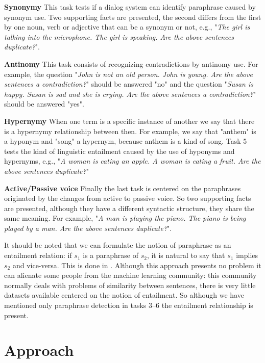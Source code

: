 \textbf{Synonymy} This task tests if a dialog system can identify paraphrase caused by synonym use. Two supporting facts are presented, the second differs from the first by one noun, verb or adjective that can be a synonym or not, e.g., "\textit{The girl is talking into the microphone. The girl is speaking. Are the above sentences duplicate?}".   


\textbf{Antinomy} This task consists of recognizing contradictions by antinomy use. For example, the question "\textit{John is not an old person. John is young. Are the above sentences a contradiction?}" should be answered "no" and the question "\textit{Susan is happy. Susan is sad and she is crying. Are the above sentences a contradiction?}" should be answered "yes".

\textbf{Hypernymy} When one term is a specific instance of another we say that there is a hypernymy relationship between then. For example, we say that "anthem" is a hyponym and "song" a hypernym, because anthem is a kind of song. Task 5 tests the kind of linguistic entailment caused by the use of hyponyms and hypernyms, e.g., "\textit{A woman is eating an apple. A woman is eating a fruit. Are the above sentences duplicate?}"


\textbf{Active/Passive voice} Finally the last task is centered on the paraphrases originated by the changes from active to passive voice. So two supporting facts are presented, although they have a different syntactic structure, they share the same meaning. For example,  "\textit{A man is playing the piano. The piano is being played by a man. Are the above sentences duplicate?}".

It should be noted that we can formulate the notion of paraphrase as an entailment relation: if $s_1$ is a paraphrase of $s_2$, it is natural to say that $s_1$ implies $s_2$ and vice-versa. This is done in \cite{Marelli14}. Although this approach presents no problem it can alienate some people from the machine learning community: this community normally deals  with problems of similarity between sentences, there is very little datasets available centered on the notion of entailment. So although we have mentioned only paraphrase detection in tasks 3--6 the entailment relationship is present.


\section{Approach}
\label{ch:03-Approach}


